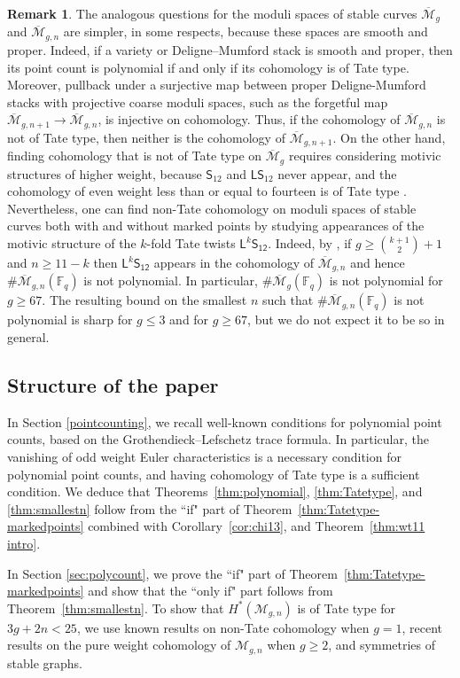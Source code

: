 \documentclass[12pt]{amsart}
\theoremstyle{definition}
\newtheorem{rem}[thm]{Remark}
\numberwithin{equation}{section}
\newcommand{\F}{\mathbb{F}}
\newcommand{\M}{\mathcal{M}}
\newcommand{\lstw}{\mathsf{L}\mathsf{S}_{12}}
\newcommand{\Mb}{\overline{\M}}
\theoremstyle{definition} %
\theoremstyle{remark}
\begin{document}
\begin{rem}
The analogous questions for the moduli spaces of stable curves $\Mb_g$ and $\Mb_{g,n}$ are simpler, in some respects, because these spaces are smooth and proper. Indeed, if a variety or Deligne--Mumford stack is smooth and proper, then its point count is polynomial if and only if its cohomology is of Tate type. Moreover, pullback under a surjective map between proper Deligne-Mumford stacks with projective coarse moduli spaces, such as the forgetful map $\Mb_{g,n+1} \to \Mb_{g,n}$, is injective on cohomology. Thus, if the cohomology of $\Mb_{g,n}$ is not of Tate type, then neither is the cohomology of $\Mb_{g,n+1}$.  On the other hand, finding cohomology that is not of Tate type on $\Mb_g$ requires considering motivic structures of higher weight, because $\mathsf{S}_{12}$ and $\lstw$ never appear, and the cohomology of even weight less than or equal to fourteen is of Tate type \cite{CLP-STE}. Nevertheless, one can find non-Tate cohomology on moduli spaces of stable curves both with and without marked points by studying appearances of the motivic structure of the $k$-fold Tate twists $\mathsf{L}^k \mathsf{S_{12}}$. Indeed, by \cite[Theorem 1.5]{CanningLarsonPayne}, if $g \geq \binom{k+1}{2} + 1$ and $n \geq 11 -k$ then $\mathsf{L}^k \mathsf{S_{12}}$ appears in the cohomology of $\Mb_{g,n}$ and hence $\# \Mb_{g,n}(\F_q)$ is not polynomial.  In particular, $\#\Mb_g(\F_q)$ is not polynomial for $g \geq 67$. The resulting bound on the smallest $n$ such that $\#\Mb_{g,n}(\F_q)$ is not polynomial is sharp for $g \leq 3$ and for $g \geq 67$, but we do not expect it to be so in general.
\end{rem} 


\subsection{Structure of the paper}
In Section \ref{pointcounting}, we recall well-known conditions for polynomial point counts, based on the Grothendieck--Lefschetz trace formula. In particular, the vanishing of odd weight Euler characteristics is a necessary condition for polynomial point counts, and having cohomology of Tate type is a sufficient condition.  We deduce that Theorems~\ref{thm:polynomial}, \ref{thm:Tatetype}, and \ref{thm:smallestn} follow from the ``if" part of Theorem~\ref{thm:Tatetype-markedpoints} combined with Corollary~\ref{cor:chi13}, and Theorem~\ref{thm:wt11 intro}.

In Section \ref{sec:polycount}, we prove the ``if" part of Theorem~\ref{thm:Tatetype-markedpoints} and show that the ``only if" part follows from Theorem~\ref{thm:smallestn}. To show that $H^*(\M_{g,n})$ is of Tate type for $3g + 2n < 25$, we use known results on non-Tate cohomology when $g=1$, recent results on the pure weight cohomology of $\M_{g,n}$ when $g\geq 2$, and symmetries of stable graphs. 
\end{document}
